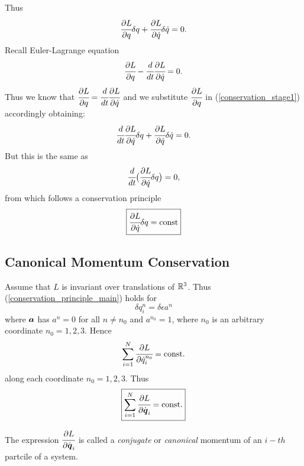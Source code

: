 \documentclass[main.tex]{subfiles}
\begin{document}
Thus
\begin{equation}
\label{conservation_stage1}
\cfrac{\partial L}{\partial q}\delta q + \cfrac{\partial L}{\partial \dot{q}}\delta \dot{q} = 0. 
\end{equation}
Recall Euler-Lagrange equation
\begin{equation}
\label{lagrange_equation3}
\cfrac{\partial L}{\partial q} - \cfrac{d}{dt}\cfrac{\partial L}{\partial \dot{q}} = 0.
\end{equation}
Thus we know that $\cfrac{\partial L}{\partial q} = \cfrac{d}{dt}\cfrac{\partial L}{\partial \dot{q}}$ and we substitute $\cfrac{\partial L}{\partial q}$ in (\ref{conservation_stage1}) accordingly obtaining:
\begin{equation}
\cfrac{d}{dt}\cfrac{\partial L}{\partial \dot{q}}\delta q + \cfrac{\partial L}{\partial \dot{q}}\delta \dot{q} = 0. 
\end{equation}
But this is the same as
\begin{equation}
\cfrac{d}{dt}\big( \cfrac{\partial L}{\partial \dot{q}}\delta q \big) = 0,
\end{equation}
from which follows a conservation principle
\begin{equation}
\label{conservation_principle_main}
\boxed{
 \cfrac{\partial L}{\partial \dot{q}}\delta q = \text{const}
 }
\end{equation}
\subsection{Canonical Momentum Conservation}
Assume that $L$ is invariant over translations of $\mathbb{R}^3$. Thus (\ref{conservation_principle_main}) holds for
\begin{equation}
\delta q^{n}_i = \delta\epsilon a^{n}
\end{equation}
where $\boldsymbol{a}$ has $a^n = 0$ for all $n\not=n_0$ and $a^{n_0} = 1$, where $n_0$ is an arbitrary coordinate $n_0 = 1, 2, 3$.
Hence
\begin{equation}
\sum_{i=1}^{N} \cfrac{\partial L}{\partial \dot{q}^{n_0}_i} = \text{const}.
\end{equation}
along each coordinate $n_0 = 1, 2, 3$. Thus
\begin{equation}
\boxed{
\sum_{i=1}^{N} \cfrac{\partial L}{\partial \dot{\boldsymbol{q}}_i} = \text{const}.
}
\end{equation}

The expression $\cfrac{\partial L}{\partial \dot{\boldsymbol{q}}_i}$ is called a \textit{conjugate} or \textit{canonical} momentum of an $i-th$ partcile of a system.
\end{document}
